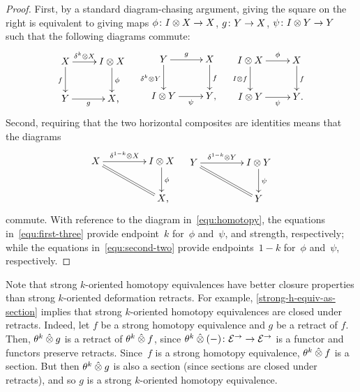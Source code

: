 \documentclass[reqno,10pt,a4paper,oneside,draft]{amsart}
\begin{document}
{{\begin{proof}
First, by a standard diagram-chasing argument, giving the square on the right is equivalent to giving maps $\phi \colon I \otimes X \to X$, $g \colon Y \to X$, $\psi \colon I \otimes Y \to Y$ such that the following diagrams commute:
\begin{align} \label{equ:first-three}
\begin{gathered}
\xymatrix{
  X
  \ar[r]^-{\kcyl \otimes X}
  \ar[d]_f
&
  \interval \otimes X
  \ar[d]^{\phi}
\\
  Y \ar[r]_-{g}
&
  X
\rlap{,}}
\end{gathered}
&&
\begin{gathered}
\xymatrix{
  Y
  \ar[r]^-g
  \ar[d]_{\kcyl \otimes Y}
&
  X
  \ar[d]^f
\\
  \interval \otimes Y
  \ar[r]_-{\psi}
&
  Y
\rlap{,}}
\end{gathered}
&&
\begin{gathered}
\xymatrix{
  \interval \otimes X
  \ar[r]^-\phi
  \ar[d]_{I \otimes f}
&
  X
  \ar[d]^{f}
\\
  \interval \otimes Y
  \ar[r]_-{\psi}
&
  Y
\rlap{.}}
\end{gathered}
\end{align}
Second, requiring that the two horizontal composites are identities means that the diagrams
\begin{align} \label{equ:second-two}
\begin{gathered}
\xymatrix@C+2em{
  X
  \ar[r]^-{\kcylinv \otimes X}
  \ar@{=}[dr]
&
  \interval \otimes X
  \ar[d]^\phi
\\&
  X
\rlap{,}}
\end{gathered}
&&
\begin{gathered}
\xymatrix@C+2em{
  Y
  \ar[r]^-{\kcylinv \otimes Y}
  \ar@{=}[dr]
&
  \interval \otimes Y
  \ar[d]^{\psi}
\\&
  Y
}
\end{gathered}
\end{align}
commute.
With reference to the diagram in~\eqref{equ:homotopy}, the equations in~\eqref{equ:first-three} provide endpoint~$k$ for~$\phi$ and~$\psi$, and strength, respectively; while the equations in~\eqref{equ:second-two} provide endpoints~$1-k$ for~$\phi$ and~$\psi$, respectively.
\end{proof}

Note that strong $k$-oriented homotopy equivalences have better closure properties than strong $k$-oriented deformation retracts.
For example, \cref{strong-h-equiv-as-section} implies that strong $k$-oriented homotopy equivalences are closed under retracts.
Indeed, let $f$ be a strong homotopy equivalence and $g$ be a retract of $f$.
Then, $\theta^k \mathbin{\hat{\otimes}} g$ is a retract of $\theta^k \mathbin{\hat{\otimes}} f$, since $\theta^k \mathbin{\hat{\otimes}} (-) \colon \mathcal{E}^\to \to \mathcal{E}^\to$ is a functor and functors preserve retracts.
Since~$f$ is a strong homotopy equivalence, $\theta^k \mathbin{\hat{\otimes}} f$ is a section.
But then $\theta^k \mathbin{\hat{\otimes}} g$ is also a section (since sections are closed under retracts), and so $g$ is a strong $k$-oriented homotopy equivalence.

}}
\end{document}
